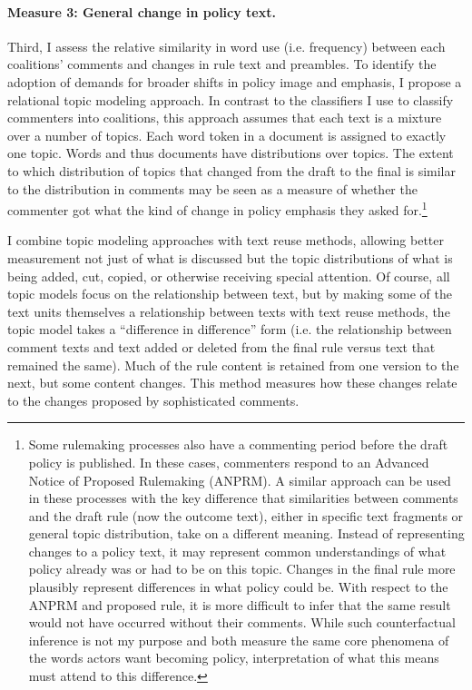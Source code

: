 \paragraph{Measure 3: General change in policy text.} Third, I assess the relative similarity in word use (i.e. frequency) between each coalitions' comments and changes in rule text and preambles. 
To identify the adoption of demands for broader shifts in policy image and emphasis, I propose a relational topic modeling approach. In contrast to the classifiers I use to classify commenters into coalitions, this approach assumes that each text is a mixture over a number of topics. Each word token in a document is assigned to exactly one topic. Words and thus documents have distributions over topics. The extent to which distribution of topics that changed from the draft to the final is similar to the distribution in comments may be seen as a measure of whether the commenter got what the kind of change in policy emphasis they asked for.\footnote{
Some rulemaking processes also have a commenting period before the draft policy is published. In these cases, commenters respond to an Advanced Notice of Proposed Rulemaking (ANPRM). A similar approach can be used in these processes with the key difference that similarities between comments and the draft rule (now the outcome text), either in specific text fragments or general topic distribution, take on a different meaning. Instead of representing changes to a policy text, it may represent common understandings of what policy already was or had to be on this topic. Changes in the final rule more plausibly represent differences in what policy could be. With respect to the ANPRM and proposed rule, it is more difficult to infer that the same result would not have occurred without their comments. While such counterfactual inference is not my purpose and both measure the same core phenomena of the words actors want becoming policy, interpretation of what this means must attend to this difference.}


I combine topic modeling approaches with text reuse methods, allowing better measurement not just of what is discussed but the topic distributions of what is being added, cut, copied, or otherwise receiving special attention. 
Of course, all topic models focus on the relationship between text, but by making some of the text units themselves a relationship between texts with text reuse methods, the topic model takes a ``difference in difference'' form (i.e. the relationship between comment texts and text added or deleted from the final rule versus text that remained the same).  %
Much of the rule content is retained from one version to the next, but some content changes. This method measures how these changes relate to the changes proposed by sophisticated comments. 

